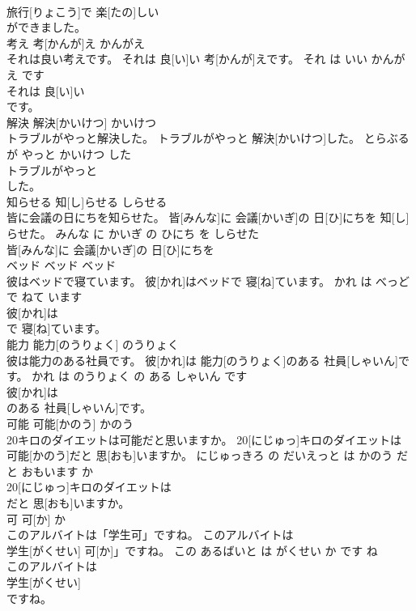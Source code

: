 \documentclass[8pt]{extreport}
\begin{document}
\begin{CJK}{UTF8}{min}
\\	旅行[りょこう]で 楽[たの]しい
\\	ができました。			
\\	考え	考[かんが]え	かんがえ	
\\	それは良い考えです。	それは 良[い]い 考[かんが]えです。	それ は いい かんがえ です	
\\	それは 良[い]い
\\	です。			
\\	解決	解決[かいけつ]	かいけつ	
\\	トラブルがやっと解決した。	トラブルがやっと 解決[かいけつ]した。	とらぶる が やっと かいけつ した	
\\	トラブルがやっと
\\	した。			
\\	知らせる	知[し]らせる	しらせる	
\\	皆に会議の日にちを知らせた。	皆[みんな]に 会議[かいぎ]の 日[ひ]にちを 知[し]らせた。	みんな に かいぎ の ひにち を しらせた	
\\	皆[みんな]に 会議[かいぎ]の 日[ひ]にちを
\\	ベッド	ベッド	ベッド	
\\	彼はベッドで寝ています。	彼[かれ]はベッドで 寝[ね]ています。	かれ は べっど で ねて います	
\\	彼[かれ]は
\\	で 寝[ね]ています。			
\\	能力	能力[のうりょく]	のうりょく	
\\	彼は能力のある社員です。	彼[かれ]は 能力[のうりょく]のある 社員[しゃいん]です。	かれ は のうりょく の ある しゃいん です	
\\	彼[かれ]は
\\	のある 社員[しゃいん]です。			
\\	可能	可能[かのう]	かのう	
\\	20キロのダイエットは可能だと思いますか。	20[にじゅっ]キロのダイエットは 可能[かのう]だと 思[おも]いますか。	にじゅっきろ の だいえっと は かのう だ と おもいます か	
\\	20[にじゅっ]キロのダイエットは
\\	だと 思[おも]いますか。			
\\	可	可[か]	か	
\\	このアルバイトは「学生可」ですね。	このアルバイトは
\\	学生[がくせい] 可[か]」ですね。	この あるばいと は がくせい か です ね	
\\	このアルバイトは
\\	学生[がくせい]
\\	ですね。			

\end{CJK}
\end{document}
